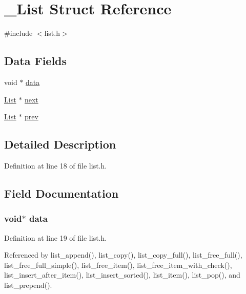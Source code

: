 \hypertarget{struct___list}{\section{\-\_\-\-List Struct Reference}
\label{struct___list}
}


{\ttfamily \#include $<$list.\-h$>$}

\subsection*{Data Fields}
\begin{DoxyCompactItemize}
\item 
void $\ast$ \hyperlink{struct___list_a735984d41155bc1032e09bece8f8d66d}{data}
\item 
\hyperlink{list_8h_af415aadeab887feeda9d2e42371a40b0}{List} $\ast$ \hyperlink{struct___list_a4ce5a16aaa87ace3fe65509ecb2674f8}{next}
\item 
\hyperlink{list_8h_af415aadeab887feeda9d2e42371a40b0}{List} $\ast$ \hyperlink{struct___list_ae84fd4e35313c1038991696042d588a4}{prev}
\end{DoxyCompactItemize}


\subsection{Detailed Description}


Definition at line 18 of file list.\-h.



\subsection{Field Documentation}
\hypertarget{struct___list_a735984d41155bc1032e09bece8f8d66d}{
\subsubsection[{data}]{\setlength{\rightskip}{0pt plus 5cm}void$\ast$ data}}\label{struct___list_a735984d41155bc1032e09bece8f8d66d}


Definition at line 19 of file list.\-h.



Referenced by list\-\_\-append(), list\-\_\-copy(), list\-\_\-copy\-\_\-full(), list\-\_\-free\-\_\-full(), list\-\_\-free\-\_\-full\-\_\-simple(), list\-\_\-free\-\_\-item(), list\-\_\-free\-\_\-item\-\_\-with\-\_\-check(), list\-\_\-insert\-\_\-after\-\_\-item(), list\-\_\-insert\-\_\-sorted(), list\-\_\-item(), list\-\_\-pop(), and list\-\_\-prepend().

